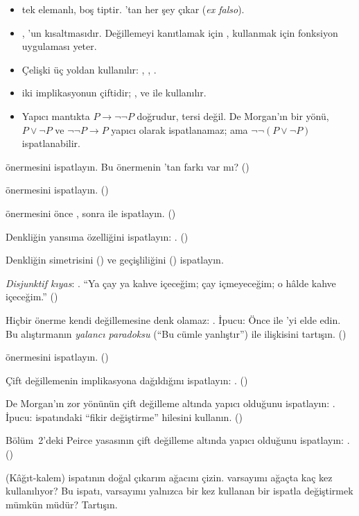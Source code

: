 \begin{bolumozeti}
\begin{itemize}
  \item {} tek elemanlı,  boş tiptir. 'tan her
        şey çıkar (\emph{ex falso}).
  \item {}, 'un kısaltmasıdır. Değillemeyi kanıtlamak
        için , kullanmak için fonksiyon uygulaması yeter.
  \item Çelişki üç yoldan kullanılır: , ,
        .
  \item {} iki implikasyonun çiftidir; ,  ve
         ile kullanılır.
  \item Yapıcı mantıkta $P \to \neg\neg P$ doğrudur, tersi değil. De
        Morgan'ın bir yönü, $P \vee \neg P$ ve $\neg\neg P \to P$
        yapıcı olarak ispatlanamaz; ama $\neg\neg(P \vee \neg P)$
        ispatlanabilir.
\end{itemize}
\end{bolumozeti}

\begin{alistirmalar}
  önermesini ispatlayın. Bu önermenin
'tan farkı var mı? ()

  önermesini ispatlayın. ()

  önermesini önce , sonra
 ile ispatlayın. ()

 Denkliğin yansıma özelliğini ispatlayın: .
()

 Denkliğin simetrisini () ve geçişliliğini
() ispatlayın.

 \emph{Disjunktif kıyas}: .
``Ya çay ya kahve içeceğim; çay içmeyeceğim; o hâlde kahve içeceğim.''
()

 Hiçbir önerme kendi değillemesine denk olamaz:
. İpucu: Önce  ile 'yi elde edin.
Bu alıştırmanın \emph{yalancı paradoksu} (``Bu cümle yanlıştır'') ile
ilişkisini tartışın. ()

  önermesini ispatlayın. ()

 Çift değillemenin implikasyona dağıldığını ispatlayın:
. ()

\label{alis:demorgan-cift} De Morgan'ın zor yönünün çift
değilleme altında yapıcı olduğunu ispatlayın:
. İpucu: 
ispatındaki ``fikir değiştirme'' hilesini kullanın. ()

\label{alis:peirce-cift} Bölüm~2'deki Peirce yasasının
çift değilleme altında yapıcı olduğunu ispatlayın:
. ()

 (Kâğıt-kalem)  ispatının doğal
çıkarım ağacını çizin.  varsayımı ağaçta kaç kez kullanılıyor?
Bu ispatı, varsayımı yalnızca bir kez kullanan bir ispatla
değiştirmek mümkün müdür? Tartışın.
\end{alistirmalar}
